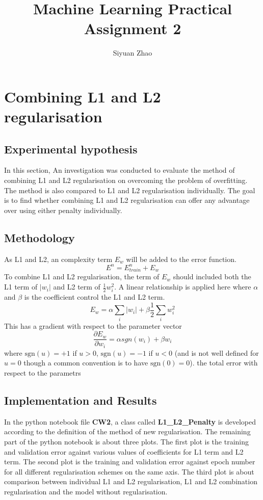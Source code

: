 \documentclass[11pt]{article}
\begin{document}
\title{Machine Learning Practical \\Assignment 2}

\author{Siyuan Zhao}
\maketitle
\section{Combining L1 and L2 regularisation}

\subsection{Experimental hypothesis}
In this section, An investigation was conducted to evaluate the method of combining L1 and L2 regularisation on overcoming the problem of overfitting. The method is also compared to L1 and L2 regularisation individually. The goal is to find whether combining L1 and L2 regularisation can offer any advantage over using either penalty individually.

\subsection{Methodology}
As L1 and L2, an complexity term $E_w$ will be added to the error function.
\begin{equation}
	E^n = E_{train}^n + E_w
\end{equation}
To combine L1 and L2 regularisation, the term of $E_w$ should included both the L1 term of $|w_i|$ and L2 term of $\frac{1}{2}w_i^2$. A linear relationship is applied here where $\alpha$ and $\beta$ is the coefficient control the L1 and L2 term.
\begin{equation}
	E_w = \alpha \sum_i|w_i| + \beta \frac{1}{2}\sum_iw_i^2
\end{equation}
This has a gradient with respect to the parameter vector
\begin{equation}
	\frac{\partial E_w}{\partial w_i} = \alpha sgn(w_i) + \beta w_i
\end{equation}
where $\textrm{sgn}(u) = +1$ if $u > 0$, $\textrm{sgn}(u) = -1$ if $u < 0$ (and is not well defined for $u=0$ though a common convention is to have $\textrm{sgn}(0) = 0$).
the total error with respect to the parametrs
\subsection{Implementation and Results}
In the python notebook file {\bf CW2}, a class called {\bf L1\_L2\_Penalty} is developed according to the definition of the method of new regularisation. The remaining part of the python notebook is about three plots. The first plot is the training and validation error against various values of coefficients for L1 term and L2 term. The second plot is the training and validation error against epoch number for all different regularisation schemes on the same axis. The third plot is about comparison between individual L1 and L2 regularisation, L1 and L2 combination regularisation and the model without regularisation. 
\end{document}
